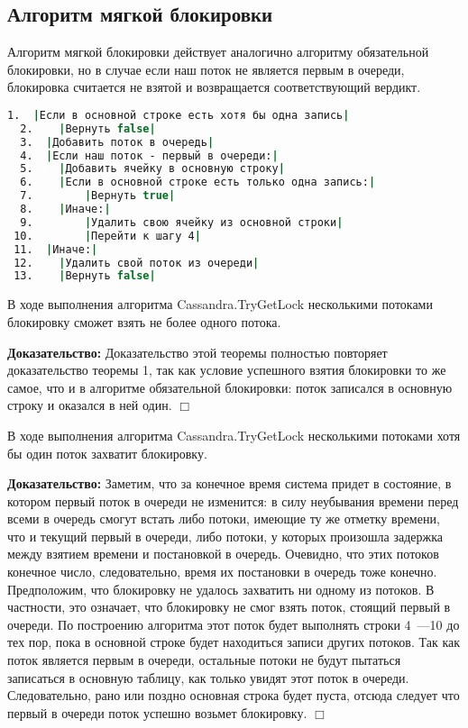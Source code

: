 \subsection{Алгоритм мягкой блокировки}

Алгоритм мягкой блокировки действует аналогично алгоритму обязательной блокировки, но в случае если наш поток не является первым в очереди, блокировка считается не взятой и возвращается соответствующий вердикт.

\begin{lstlisting}[language=csh,caption={Алгоритм Cassandra.TryGetLock(lockId, threadId)}]
  1.  |Если в основной строке есть хотя бы одна запись|
  2.  	|Вернуть false|
  3.  |Добавить поток в очередь|
  4.  |Если наш поток - первый в очереди:|
  5.  	|Добавить ячейку в основную строку|
  6.  	|Если в основной строке есть только одна запись:|
  7.  		|Вернуть true|
  8.  	|Иначе:|
  9.  		|Удалить свою ячейку из основной строки|
 10.  		|Перейти к шагу 4|
 11.  |Иначе:|
 12.  	|Удалить свой поток из очереди|
 13.  	|Вернуть false|
\end{lstlisting}

\begin{theorem}
В ходе выполнения алгоритма Cassandra.TryGetLock несколькими потоками блокировку сможет взять не более одного потока.
\end{theorem}
\textbf{Доказательство:}
Доказательство этой теоремы полностью повторяет доказательство теоремы 1, так как условие успешного взятия блокировки то же самое, что и в алгоритме обязательной блокировки: поток записался в основную строку и оказался в ней один.
$\Box$

\begin{theorem}
В ходе выполнения алгоритма Cassandra.TryGetLock несколькими потоками хотя бы один поток захватит блокировку.
\end{theorem}
\textbf{Доказательство:}
Заметим, что за конечное время система придет в состояние, в котором первый поток в очереди не изменится: в силу неубывания времени перед всеми в очередь смогут встать либо потоки, имеющие ту же отметку времени, что и текущий первый в очереди, либо потоки, у которых произошла задержка между взятием времени и постановкой в очередь. Очевидно, что этих потоков конечное число, следовательно, время их постановки в очередь тоже конечно.
Предположим, что блокировку не удалось захватить ни одному из потоков. В частности, это означает, что блокировку не смог взять поток, стоящий первый в очереди. По построению алгоритма этот поток будет выполнять строки 4~---10 до тех пор, пока в основной строке будет находиться записи других потоков. Так как поток является первым в очереди, остальные потоки не будут пытаться записаться в основную таблицу, как только увидят этот поток в очереди. Следовательно, рано или поздно основная строка будет пуста, отсюда следует что первый в очереди поток успешно возьмет блокировку.
$\Box$
